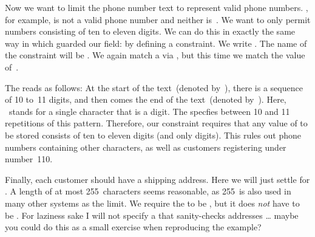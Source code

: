 Now we want to limit the phone number text to represent valid phone numbers.
, for example, is not a valid phone number and neither is~.
We want to only permit numbers consisting of ten to eleven digits.
We can do this in exactly the same way in which guarded our  field:
by defining a constraint.
We write \sqlIdx{\$}\sqlIdx{\^}\sqlIdx{\textasciitilde}.
The name of the constraint will be .
We again match a  via \sqlIdx{\textasciitilde}\sqlil{\~}, but this time we match the value of~.

The  \sqlIdx{\$}\sqlIdx{\textasciicircum} reads as follows:
At the start of the text~(denoted by~\textil{\^}\sqlIdx{\textasciicircum}), there is a sequence of 10 to~11 digits, and then comes the end of the text~(denoted by~\textil{\$}\sqlIdx{\$}).
Here, \textil{\\d}\ stands for a single character that is a digit.
The  specfies between 10 and 11 repetitions of this pattern.
Therefore, our constraint requires that any value of  to be stored consists of ten to eleven digits (and only digits).
This rules out phone numbers containing other characters, as well as customers registering under number~110.

Finally, each customer should have a shipping address.
Here we will just settle for .
A length of at most 255~characters seems reasonable, as 255~is also used in many other systems as the limit.
We require the  to be , but it does \emph{not} have to be .
For laziness sake I will not specify a  that sanity-checks addresses {\dots} maybe you could do this as a small exercise when reproducing the example?

